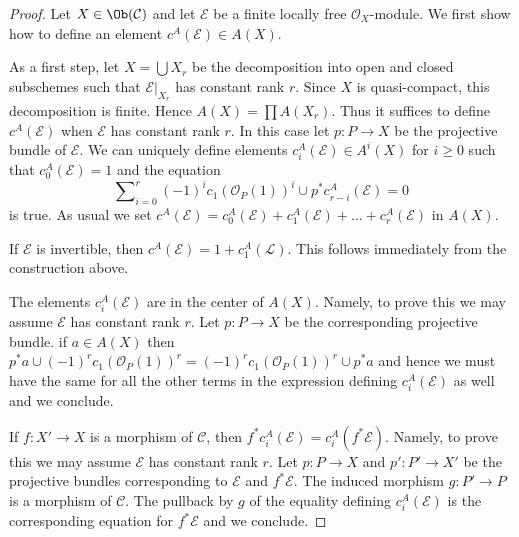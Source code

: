 \begin{proof}
Let $X \in \Ob(\mathcal{C})$ and let $\mathcal{E}$ be a finite
locally free $\mathcal{O}_X$-module. We first show how to define
an element $c^A(\mathcal{E}) \in A(X)$.

\medskip\noindent
As a first step, let $X = \bigcup X_r$ be the decomposition into
open and closed subschemes such that $\mathcal{E}|_{X_r}$ has
constant rank $r$. Since $X$ is quasi-compact, this decomposition
is finite. Hence $A(X) = \prod A(X_r)$. Thus it suffices to define
$c^A(\mathcal{E})$ when $\mathcal{E}$ has constant rank $r$. In this
case let $p : P \to X$ be the projective bundle of $\mathcal{E}$.
We can uniquely define elements $c_i^A(\mathcal{E}) \in A^i(X)$
for $i \geq 0$ such that $c_0^A(\mathcal{E}) = 1$ and the equation
\begin{equation}
\label{equation-chern-classes}
\sum\nolimits_{i = 0}^r
(-1)^i c_1(\mathcal{O}_P(1))^i \cup p^*c^A_{r - i}(\mathcal{E})
= 0
\end{equation}
is true. As usual we set
$c^A(\mathcal{E}) = c_0^A(\mathcal{E}) + c_1^A(\mathcal{E}) + \ldots
+ c_r^A(\mathcal{E})$ in $A(X)$.

\medskip\noindent
If $\mathcal{E}$ is invertible, then
$c^A(\mathcal{E}) = 1 + c_1^A(\mathcal{L})$.
This follows immediately from the construction above.

\medskip\noindent
The elements $c_i^A(\mathcal{E})$ are in the center of $A(X)$.
Namely, to prove this we may assume $\mathcal{E}$ has constant rank $r$.
Let $p : P \to X$ be the corresponding projective bundle.
if $a \in A(X)$ then $p^*a \cup (-1)^r c_1(\mathcal{O}_P(1))^r =
(-1)^r c_1(\mathcal{O}_P(1))^r \cup p^*a$ and hence we must have the same
for all the other terms in the expression defining $c_i^A(\mathcal{E})$
as well and we conclude.

\medskip\noindent
If $f : X' \to X$ is a morphism of $\mathcal{C}$, then
$f^*c_i^A(\mathcal{E}) = c_i^A(f^*\mathcal{E})$.
Namely, to prove this we may assume $\mathcal{E}$ has constant rank $r$.
Let $p : P \to X$ and $p' : P' \to X'$ be the projective
bundles corresponding to $\mathcal{E}$ and $f^*\mathcal{E}$.
The induced morphism $g : P' \to P$ is a morphism of $\mathcal{C}$.
The pullback by $g$ of the equality defining $c_i^A(\mathcal{E})$
is the corresponding equation for $f^*\mathcal{E}$ and we conclude.


\end{proof}
